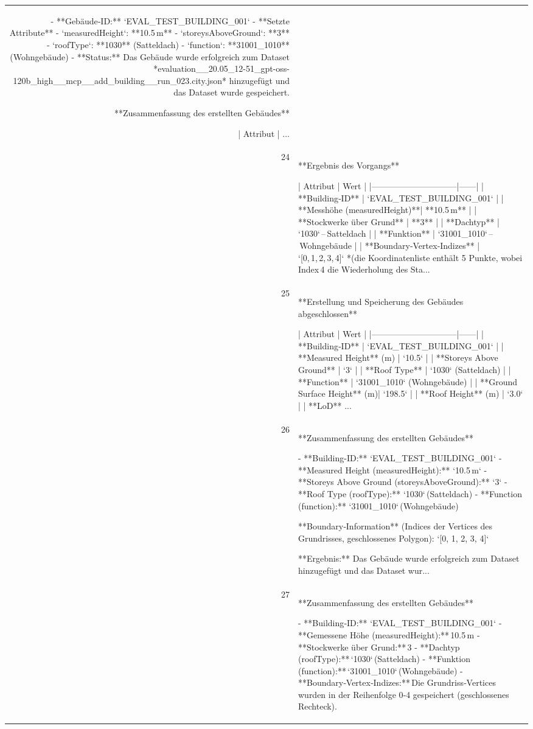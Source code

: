 \documentclass[a4paper,11pt]{article}
\begin{document}
\begin{table}[ht]
\begin{tabular}{r p{12cm}}
- **Gebäude‑ID:** `EVAL\_TEST\_BUILDING\_001`  
- **Setzte Attribute**
  - `measuredHeight`: **10.5 m**  
  - `storeysAboveGround`: **3**  
  - `roofType`: **1030** (Satteldach)  
  - `function`: **31001\_1010** (Wohngebäude)  
- **Status:** Das Gebäude wurde erfolgreich zum Dataset *evaluation\_\_20.05\_12-51\_gpt-oss-120b\_high\_\_mcp\_\_add\_building\_\_run\_023.city.json* hinzugefügt und das Dataset wurde gespeichert.  

**Zusammenfassung des erstellten Gebäudes**  

| Attribut | ... \\
24 & **Ergebnis des Vorgangs**

| Attribut                     | Wert |
|------------------------------|------|
| **Building‑ID**              | `EVAL\_TEST\_BUILDING\_001` |
| **Messhöhe (measuredHeight)**| **10.5 m** |
| **Stockwerke über Grund**    | **3** |
| **Dachtyp**                  | `1030` – Satteldach |
| **Funktion**                 | `31001\_1010` – Wohngebäude |
| **Boundary‑Vertex‑Indizes** | `[0, 1, 2, 3, 4]` *(die Koordinatenliste enthält 5 Punkte, wobei Index 4 die Wiederholung des Sta... \\
25 & **Erstellung und Speicherung des Gebäudes abgeschlossen**

| Attribut                     | Wert |
|------------------------------|------|
| **Building‑ID**              | `EVAL\_TEST\_BUILDING\_001` |
| **Measured Height** (m)      | `10.5` |
| **Storeys Above Ground**     | `3` |
| **Roof Type**                | `1030` (Satteldach) |
| **Function**                 | `31001\_1010` (Wohngebäude) |
| **Ground Surface Height** (m)| `198.5` |
| **Roof Height** (m)          | `3.0` |
| **LoD**          ... \\
26 & **Zusammenfassung des erstellten Gebäudes**

- **Building-ID:** `EVAL\_TEST\_BUILDING\_001`  
- **Measured Height (measuredHeight):** `10.5 m`  
- **Storeys Above Ground (storeysAboveGround):** `3`  
- **Roof Type (roofType):** `1030` (Satteldach)  
- **Function (function):** `31001\_1010` (Wohngebäude)  

**Boundary‑Information** (Indices der Vertices des Grundrisses, geschlossenes Polygon):  
`[0, 1, 2, 3, 4]`

**Ergebnis:** Das Gebäude wurde erfolgreich zum Dataset hinzugefügt und das Dataset wur... \\
27 & **Zusammenfassung des erstellten Gebäudes**

- **Building‑ID:** `EVAL\_TEST\_BUILDING\_001`  
- **Gemessene Höhe (measuredHeight):** 10.5 m  
- **Stockwerke über Grund:** 3  
- **Dachtyp (roofType):** `1030` (Satteldach)  
- **Funktion (function):** `31001\_1010` (Wohngebäude)  
- **Boundary‑Vertex‑Indizes:** Die Grundriss‑Vertices wurden in der Reihenfolge 0‑4 gespeichert (geschlossenes Rechteck).  


\end{tabular}
\end{table}
\end{document}
